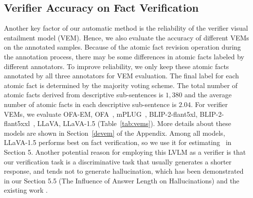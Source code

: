 \subsection{Verifier Accuracy on Fact Verification}
\label{43verifer}
Another key factor of our automatic method is the reliability of the verifier visual entailment model (VEM). Hence, we also evaluate the accuracy of different VEMs on the annotated samples. Because of the atomic fact revision operation during the annotation process, there may be some differences in atomic facts labeled by different annotators. To improve reliability, we only keep these atomic facts annotated by all three annotators for VEM evaluation. The final label for each atomic fact is determined by the majority voting scheme. The total number of atomic facts derived from descriptive sub-sentences is $1,380$ and the average number of atomic facts in each descriptive sub-sentence is $2.04$. For verifier VEMs, we evaluate OFA-EM, OFA~\cite{ofa}, mPLUG~\cite{mplug}, BLIP-2-flant5xl, BLIP-2-flant5xxl~\cite{blip2}, LLaVA, LLaVA-1.5 
(Table~\ref{tab:vems}). More details about these models are shown in Section~\ref{devem} of the Appendix. 
Among all models, LLaVA-1.5 performs best on fact verification, so we use it for estimating \ours\ in Section 5.  
\textcolor[rgb]{0,0,0}{
Another potential reason for employing this LVLM as a verifier is that our verification task is a discriminative task that usually generates a shorter response, and tends not to generate hallucination, which has been demonstrated in our Section 5.5 (The Influence of Answer Length on Hallucinations) and the existing work \cite{factscore,TIFA}.
}








